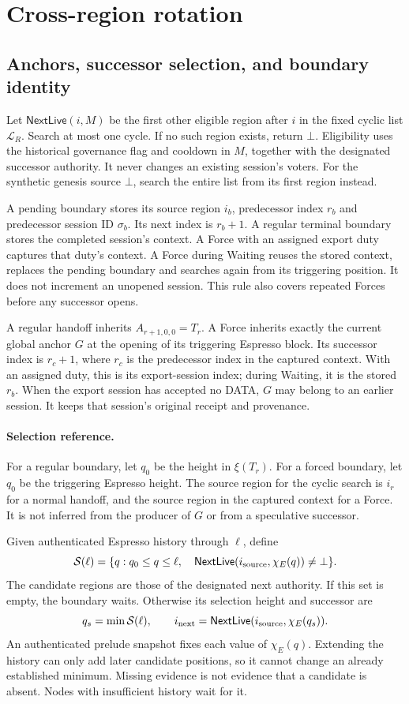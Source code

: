 \documentclass[11pt,a4paper]{article}
\newcommand{\tagg}[1]{\ensuremath{\mathsf{#1}}}
\newcounter{protocol}
\begin{document}
\section{Cross-region rotation}
\label{sec:xprotocols}
\subsection{Anchors, successor selection, and boundary identity}
\label{sec:witness}
Let $\tagg{NextLive}(i,M)$ be the first other eligible region after $i$
in the fixed cyclic list $\mathcal L_R$. Search at most one cycle.
If no such region exists, return $\bot$. Eligibility uses the historical
governance flag and cooldown in $M$, together with the designated
successor authority. It never changes an existing session's voters.
For the synthetic genesis source $\bot$, search the entire list from
its first region instead.

A pending boundary stores its source region $i_b$, predecessor index
$r_b$ and predecessor session ID $\sigma_b$. Its next index is $r_b+1$.
A regular terminal boundary stores the completed session's context.
A Force with an assigned export duty captures that duty's context.
A Force during Waiting reuses the stored context, replaces the pending
boundary and searches again from its triggering position. It does not
increment an unopened session. This rule also covers repeated Forces
before any successor opens.

A regular handoff inherits $A_{r+1,0,0}=T_r$.
A Force inherits exactly the current global anchor $G$ at the opening
of its triggering Espresso block. Its successor index is $r_c+1$,
where $r_c$ is the predecessor index in the captured context. With an
assigned duty, this is its export-session index; during Waiting, it is
the stored $r_b$. When the export session has accepted no DATA, $G$ may
belong to an earlier session. It keeps that session's original receipt and provenance.

\paragraph{Selection reference.}
For a regular boundary, let $q_0$ be the height in $\xi(T_r)$.
For a forced boundary, let $q_0$ be the triggering Espresso height.
The source region for the cyclic search is $i_r$ for a normal handoff,
and the source region in the captured context for a Force. It is not inferred from
the producer of $G$ or from a speculative successor.

Given authenticated Espresso history through $\ell$, define
\[
 \mathcal S(\ell)=\{q:q_0\le q\le\ell,\quad
       \tagg{NextLive}(i_{\rm source},\chi_E(q))\ne\bot\}.
\]
The candidate regions are those of the designated next authority.
If this set is empty, the boundary waits. Otherwise its selection
height and successor are
\[
 q_s=\min\mathcal S(\ell),\qquad
 i_{\rm next}=\tagg{NextLive}(i_{\rm source},\chi_E(q_s)).
\]
An authenticated prelude snapshot fixes each value of $\chi_E(q)$.
Extending the history can only add later candidate positions, so it
cannot change an already established minimum. Missing evidence is not
evidence that a candidate is absent. Nodes with insufficient history
wait for it.
\end{document}
